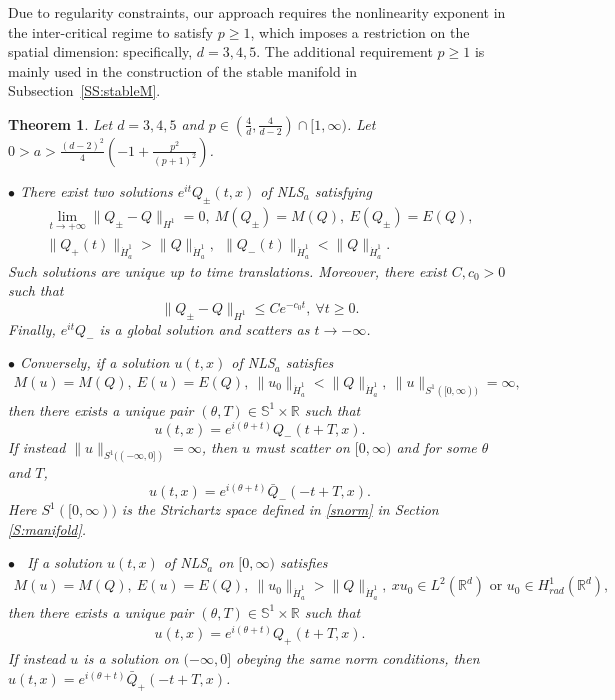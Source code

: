 \documentclass[12pt]{amsart}
\newcommand{\R}{\mathbb R}
\newtheorem{theorem}{Theorem}[section]
\begin{document}
 Due to regularity constraints, our approach requires the nonlinearity exponent in the inter-critical regime to satisfy $p\ge 1$, which imposes a restriction on the spatial dimension: specifically, $d=3,4,5$. The additional requirement  $p\ge 1$ is mainly used in the construction of the stable manifold in Subsection~\ref{SS:stableM}.
    
   \begin{theorem} Let $d=3,4,5$ and $p\in (\frac 4d, \frac 4{d-2})\cap[1,\infty)$. Let $0>a>\tfrac{(d-2)^2}4(-1+\tfrac{p^2}{(p+1)^2})$. 
   
   $\bullet$ There exist two solutions $e^{it}Q_{\pm}(t, x)$ of NLS$_a$ satisfying 
   \begin{gather*}
   \lim_{t \to +\infty} \|Q_{\pm}-Q\|_{H^1}=0, \    M(Q_{\pm})=M(Q), \ E(Q_{\pm})=E(Q),\\
 \|Q_+(t)\|_{\dot H^1_a}>\|Q\|_{\dot H^1_a}, \ \ \|Q_-(t)\|_{\dot H^1_a}<\|Q\|_{\dot H^1_a}.
   \end{gather*}
Such solutions are unique up to time translations. Moreover, there exist $C, c_0>0$ such that    
\[
\|Q_{\pm}-Q\|_{H^1} \le C e^{- c_0t}, \ \forall t\ge 0.
\]
Finally,   $e^{it} Q_-$ is a global solution and scatters as $ t\to -\infty$. 
   
  $\bullet$ Conversely, if a solution $u(t,x)$ of NLS$_a$ satisfies 
   \begin{align*}
   M(u)=M(Q), \ E(u)=E(Q), \ \|u_0\|_{\dot H^1_a}<\|Q\|_{\dot H^1_a}, \ \|u\|_{S^1([0,\infty))}=\infty,
   \end{align*}
   then there exists a unique pair $(\theta, T)\in \mathbb S^1\times \mathbb R$ such that 
\[
   u(t,x)=e^{i(\theta+t)}Q_-(t+T,x).
   \]
If instead $\|u\|_{S^1((-\infty,0])}=\infty$, then $u$ must  scatter on $[0, \infty)$ and for some $\theta$ and $T$, 
   \[u(t,x)=e^{i(\theta+t)}\bar Q_-(-t+T,x).\]
      Here $S^1([0,\infty))$ is the Strichartz space defined in \eqref{snorm} in Section \ref{S:manifold}. 
   
   $\bullet$ \  If a solution $u(t,x)$ of NLS$_a$ on $ [0, \infty)$ satisfies 
   \begin{align*}
   M(u)=M(Q), \ E(u)=E(Q), \ \|u_0\|_{\dot H^1_a}>\|Q\|_{\dot H^1_a}, \ xu_0\in L^2(\R^d) \mbox{ or } u_0\in H^1_{rad}(\R^d),
   \end{align*}
   then there exists a unique pair $(\theta, T)\in \mathbb S^1\times \mathbb R$ such that 
   \begin{align*}
   u(t,x)=e^{i(\theta+t)}Q_+(t+T,x).
   \end{align*}
If instead $u$ is a solution on $(-\infty,0]$ obeying the same norm conditions, then $u(t,x)=e^{i(\theta+t)}\bar Q_+(-t+T,x)$. 
     \end{theorem}
     
\end{document}
